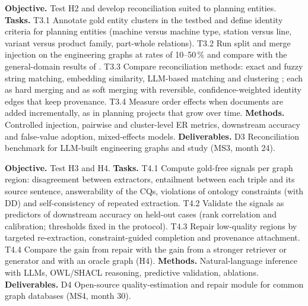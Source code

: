\textbf{Objective.} Test H2 and develop reconciliation suited to planning entities.
\textbf{Tasks.} T3.1 Annotate gold entity clusters in the testbed and define identity criteria for planning entities (machine versus machine type, station versus line, variant versus product family, part-whole relations). T3.2 Run split and merge injection on the engineering graphs at rates of 10--50\,\% and compare with the general-domain results of \parencite{reider2026graph}. T3.3 Compare reconciliation methods: exact and fuzzy string matching, embedding similarity, \ac{LLM}-based matching and clustering \parencite{peeters2023entity,wang2024match,fu2025incontext}; each as hard merging and as soft merging with reversible, confidence-weighted identity edges that keep provenance. T3.4 Measure order effects when documents are added incrementally, as in planning projects that grow over time.
\textbf{Methods.} Controlled injection, pairwise and cluster-level \ac{ER} metrics, downstream accuracy and false-value adoption, mixed-effects models.
\textbf{Deliverables.} D3 Reconciliation benchmark for \ac{LLM}-built engineering graphs and study (MS3, month 24).

\textbf{Objective.} Test H3 and H4.
\textbf{Tasks.} T4.1 Compute gold-free signals per graph region: disagreement between extractors, entailment between each triple and its source sentence, answerability of the \acp{CQ}, violations of ontology constraints (with DD) and self-consistency of repeated extraction. T4.2 Validate the signals as predictors of downstream accuracy on held-out cases (rank correlation and calibration; thresholds fixed in the protocol). T4.3 Repair low-quality regions by targeted re-extraction, constraint-guided completion and provenance attachment. T4.4 Compare the gain from repair with the gain from a stronger retriever or generator and with an oracle graph (H4).
\textbf{Methods.} Natural-language inference with \acp{LLM}, \ac{OWL}/SHACL reasoning, predictive validation, ablations.
\textbf{Deliverables.} D4 Open-source quality-estimation and repair module for common graph databases (MS4, month 30).

